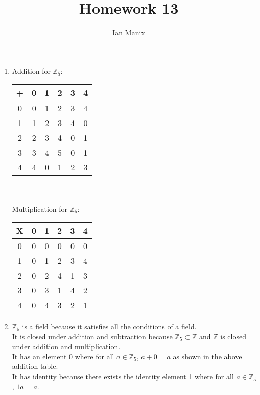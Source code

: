 \documentclass[sigconf]{article}
\title{
  \textbf{Homework 13} \\
  }
\author{ 
  Ian Manix
  }
\begin{document}



\maketitle




\begin{enumerate}
  \item Addition for $\mathbb{Z}_5$:\\
    \begin{tabular}{c|ccccc}
      + & 0 & 1 & 2 & 3 & 4 \\
      \hline
      0 & 0 & 1 & 2 & 3 & 4 \\
      1 & 1 & 2 & 3 & 4 & 0 \\
      2 & 2 & 3 & 4 & 0 & 1 \\
      3 & 3 & 4 & 5 & 0 & 1 \\
      4 & 4 & 0 & 1 & 2 & 3 \\
    \end{tabular}\\\\
    Multiplication for $\mathbb{Z}_5$:\\
    \begin{tabular}{c|ccccc}
      X & 0 & 1 & 2 & 3 & 4 \\
      \hline
      0 & 0 & 0 & 0 & 0 & 0 \\
      1 & 0 & 1 & 2 & 3 & 4 \\
      2 & 0 & 2 & 4 & 1 & 3 \\
      3 & 0 & 3 & 1 & 4 & 2 \\
      4 & 0 & 4 & 3 & 2 & 1 \\
    \end{tabular}
  \item $\mathbb{Z}_5$ is a field because it satisfies all the conditions of a field.\\
      It is closed under addition and subtraction because $\mathbb{Z}_5\subset\mathbb{Z}$ and $\mathbb{Z}$ is closed under addition and multiplication.\\
      It has an element 0 where for all $a\in\mathbb{Z}_5$, $a+0=a$ as shown in the above addition table.\\
      It has identity because there exists the identity element 1 where for all $a\in\mathbb{Z}_5$, $1a=a$.\\

\end{enumerate}
\end{document}
